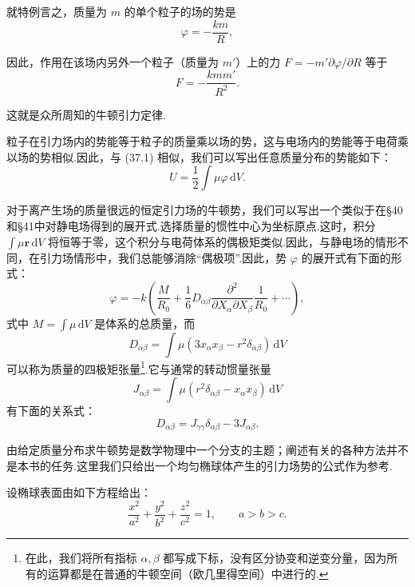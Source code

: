 就特例言之，质量为 $m$ 的单个粒子的场的势是
\begin{equation}
  \varphi=-\frac{km}{R},
\end{equation}

因此，作用在该场内另外一个粒子（质量为 $m'$）上的力 $F=-m'\partial\varphi/\partial R$ 等于
\begin{equation}
  F=-\frac{kmm'}{R^{2}}.
\end{equation}

这就是众所周知的牛顿引力定律.

粒子在引力场内的势能等于粒子的质量乘以场的势，这与电场内的势能等于电荷乘以场的势相似.因此，与 (37.1) 相似，我们可以写出任意质量分布的势能如下：
\begin{equation}
  U=\frac{1}{2}\int\mu\varphi\,\mathrm{d}V.
\end{equation}

对于离产生场的质量很远的恒定引力场的牛顿势，我们可以写出一个类似于在§40和§41中对静电场得到的展开式.选择质量的惯性中心为坐标原点.这时，积分 $\int\mu\boldsymbol{r}\,\mathrm{d}V$ 将恒等于零，这个积分与电荷体系的偶极矩类似.因此，与静电场的情形不同，在引力场情形中，我们总能够消除“偶极项”.因此，势 $\varphi$ 的展开式有下面的形式：
\begin{equation}
  \varphi=-k\left(\frac{M}{R_0}
  +\frac{1}{6}D_{\alpha\beta}
  \frac{\partial^{2}}{\partial X_{\alpha}\partial X_{\beta}}
  \frac{1}{R_0}+\cdots\right),
\end{equation}
式中 $M=\int\mu\,\mathrm{d}V$ 是体系的总质量，而
\begin{equation}
  D_{\alpha\beta}=\int\mu(3x_{\alpha}x_{\beta}-r^{2}\delta_{\alpha\beta})
  \,\mathrm{d}V
\end{equation}
可以称为质量的四极矩张量\footnote{在此，我们将所有指标 $\alpha,\beta$ 都写成下标，没有区分协变和逆变分量，因为所有的运算都是在普通的牛顿空间（欧几里得空间）中进行的.}.它与通常的转动惯量张量
\begin{equation*}
  J_{\alpha\beta}=\int\mu(r^{2}\delta_{\alpha\beta}-x_{\alpha}x_{\beta})
  \,\mathrm{d}V
\end{equation*}
有下面的关系式：
\begin{equation}
  D_{\alpha\beta}=J_{\gamma\gamma}\delta_{\alpha\beta}-3J_{\alpha\beta}.
\end{equation}

由给定质量分布求牛顿势是数学物理中一个分支的主题；阐述有关的各种方法并不是本书的任务.这里我们只给出一个均匀椭球体产生的引力场势的公式作为参考.

设椭球表面由如下方程给出：
\begin{equation}
  \frac{x^{2}}{a^{2}}+\frac{y^{2}}{b^{2}}+\frac{z^{2}}{c^{2}}=1,
  \qquad a>b>c.
\end{equation}

